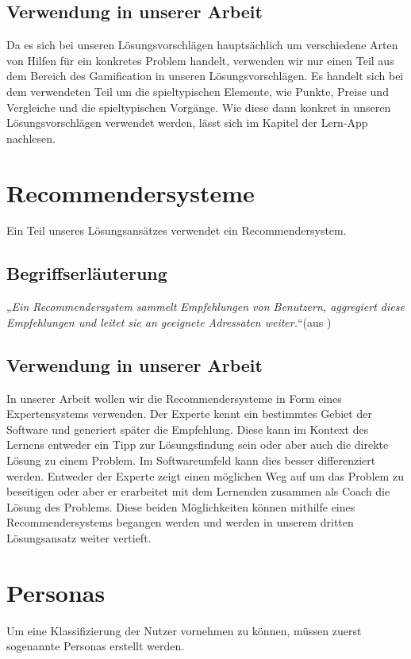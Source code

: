 \subsection{Verwendung in unserer Arbeit}
Da es sich bei unseren Lösungsvorschlägen hauptsächlich um verschiedene Arten von Hilfen für ein konkretes Problem handelt, verwenden wir nur einen Teil aus dem Bereich des Gamification in unseren Lösungsvorschlägen. Es handelt sich bei dem verwendeten Teil um die spieltypischen Elemente, wie Punkte, Preise und Vergleiche und die spieltypischen Vorgänge. Wie diese dann konkret in unseren Lösungsvorschlägen verwendet werden, lässt sich im Kapitel der Lern-App nachlesen.

\section{Recommendersysteme}
Ein Teil unseres Lösungsansätzes verwendet ein Recommendersystem.
\subsection{Begriffserläuterung}
„\textit{Ein Recommendersystem sammelt Empfehlungen von Benutzern, aggregiert diese Empfehlungen und leitet sie an geeignete Adressaten weiter.}“(aus \cite{recommender})

\subsection{Verwendung in unserer Arbeit}
In unserer Arbeit wollen wir die Recommendersysteme in Form eines Expertensystems verwenden.  Der Experte kennt ein bestimmtes Gebiet der Software und generiert später die Empfehlung. Diese kann im Kontext des Lernens entweder ein Tipp zur Lösungsfindung sein oder aber auch die direkte Lösung zu einem Problem. Im Softwareumfeld kann dies besser differenziert werden. Entweder der Experte zeigt einen möglichen  Weg auf um das Problem zu beseitigen oder aber er erarbeitet mit dem Lernenden zusammen als Coach die Lösung des Problems. Diese beiden Möglichkeiten können mithilfe eines Recommendersystems begangen werden und werden in unserem dritten Lösungsansatz weiter vertieft.

\section{Personas}
Um eine Klassifizierung der Nutzer vornehmen zu können, müssen zuerst sogenannte Personas erstellt werden.

